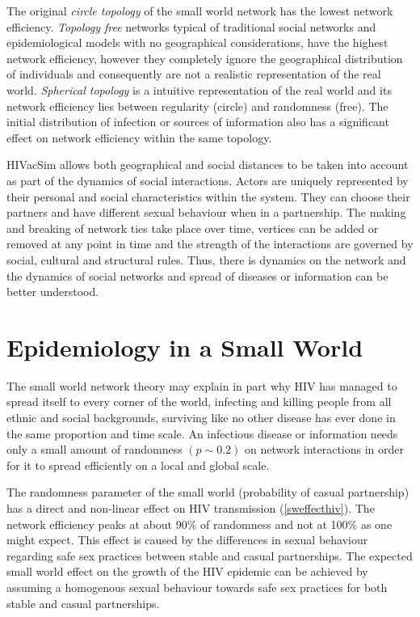 The original \emph{circle topology} of the small world network has the lowest network
efficiency. \emph{Topology free} networks typical of traditional social networks and
epidemiological models with no geographical considerations, have the highest network
efficiency, however they completely ignore the geographical distribution of individuals
and consequently are not a realistic representation of the real world. \emph{Spherical
topology} is a intuitive representation of the real world and its network efficiency lies
between regularity (circle) and randomness (free). The initial distribution of infection
or sources of information also has a significant effect on network efficiency within the
same topology.

HIVacSim allows both geographical and social distances to be taken into account as part
of the dynamics of social interactions. Actors are uniquely represented by their personal
and social characteristics within the system. They can choose their partners and have
different sexual behaviour when in a partnership. The making and breaking of network ties
take place over time, vertices can be added or removed at any point in time and the
strength of the interactions are governed by social, cultural and structural rules. Thus,
there is dynamics on the network and the dynamics of social networks and spread of
diseases or information can be better understood.


\section{Epidemiology in a Small World}

The small world network theory may explain in part why HIV has managed to spread itself
to every corner of the world, infecting and killing people from all ethnic and social
backgrounds, surviving like no other disease has ever done in the same proportion and
time scale. An infectious disease or information needs only a small amount of randomness
$(p \sim 0.2)$ on network interactions in order for it to spread efficiently on a local
and global scale.

The randomness parameter of the small world (probability of casual partnership) has a
direct and non-linear effect on HIV transmission (\ref{sweffecthiv}). The network
efficiency peaks at about 90\% of randomness and not at 100\% as one might expect. This
effect is caused by the differences in sexual behaviour regarding safe sex practices
between stable and casual partnerships. The expected small world effect on the growth of
the HIV epidemic can be achieved by assuming a homogenous sexual behaviour towards safe
sex practices for both stable and casual partnerships.


